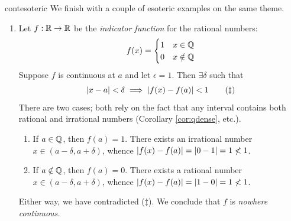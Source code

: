 \begin{examples}{}{contesoteric}
	We finish with a couple of esoteric examples on the same theme.
	\begin{enumerate}

		\item Let $f:\mathbb{R}\to\mathbb{R}$ be the \emph{indicator function} for the rational numbers:
		\[
			f(x)=
			\begin{cases}
				1&x\in\mathbb{Q}\\
				0&x\notin\mathbb{Q}
			\end{cases}
		\]
		Suppose $f$ is continuous at $a$ and let $\epsilon=1$. Then $\exists\delta$ such that 
		\[
			\left| x-a\right|<\delta\implies \left| f(x)-f(a)\right|<1 \tag{$\ddag$}
		\]
		There are two cases; both rely on the fact that any interval contains both rational and irrational numbers (Corollary \ref{cor:qdense}, etc.).
		\begin{enumerate}
			\item If $a\in\mathbb{Q}$, then $f(a)=1$. There exists an irrational number $x\in(a-\delta,a+\delta)$, whence $\left| f(x)-f(a)\right|=\left| 0-1\right|=1\not <1$.
			\item If $a\notin\mathbb{Q}$, then $f(a)=0$. There exists a rational number $x\in(a-\delta,a+\delta)$, whence $\left| f(x)-f(a)\right|=\left| 1-0\right|=1\not <1$.
		\end{enumerate}
		Either way, we have contradicted ($\ddag$). We conclude that $f$ is \emph{nowhere continuous.} 
	

\end{enumerate}
\end{examples}
